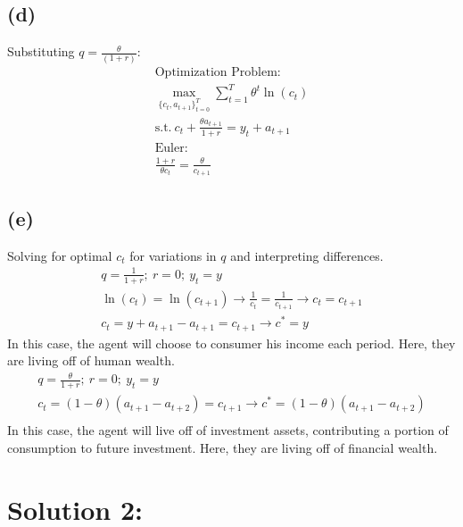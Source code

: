 \documentclass[10pt,a4paper]{article}
\newcommand{\sumt}{\sum\limits_{t=1}^{T}}
\begin{document}
    \subsection*{(d)}
        Substituting $q = \frac{\theta}{(1+r)}$:
        \begin{gather*}
            \text{Optimization Problem:} \\
            \max_{\{c_t,a_{t+1}\}_{t=0}^{T}}\sumt\theta^t\ln(c_t) \\
            \text{s.t.} \ c_t + \frac{\theta a_{t+1}}{1+r} = y_t + a_{t+1} \\
            \text{Euler:} \\
            \frac{1+r}{\theta c_t} = \frac{\theta}{c_{t+1}}
        \end{gather*}
    \subsection*{(e)}
        Solving for optimal $c_t$ for variations in $q$ and interpreting differences.
        \begin{gather*}
            q = \frac{1}{1+r}; \ r=0; \ y_t = y \\
            \ln(c_t) = \ln(c_{t+1}) \rightarrow \frac{1}{c_t} = \frac{1}{c_{t+1}} \rightarrow c_t = c_{t+1} \\
            c_t = y + a_{t+1} - a_{t+1} = c_{t+1} \rightarrow c^* = y
        \end{gather*}
        In this case, the agent will choose to consumer his income each period. Here, they are living off of human wealth.
        \begin{gather*}
            q = \frac{\theta}{1+r}; \ r=0; \ y_t = y \\
            c_t = (1-\theta)(a_{t+1} - a_{t+2}) = c_{t+1} \rightarrow c^* = (1-\theta)(a_{t+1} - a_{t+2}) \\
        \end{gather*}
        In this case, the agent will live off of investment assets, contributing a portion of consumption to future investment.
        Here, they are living off of financial wealth.
\section*{Solution 2:}
\end{document}

